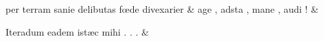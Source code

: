 \documentclass[12pt,onecolumn,twoside,a4paper]{memoir}
\begin{document}
\begin{pairs}
\begin{Leftside}
                              per
                              terram
                              sanie
                              delibutas
                              fœde
                              divexarier \&
                         \stanza {}age
                              ,
                              adsta
                              ,
                              mane
                              ,
                              audi
                              ! & 
                     
                              Iteradum
                              eadem
                              istæc
                              mihi
                              .
                              .
                              . \&
                         \stanza {}
                     

\end{Leftside}
\end{pairs}
\end{document}
